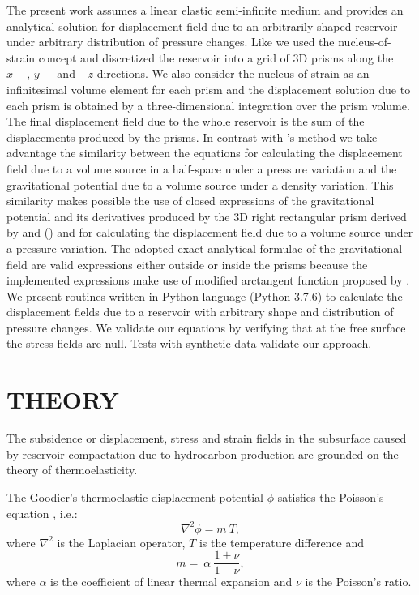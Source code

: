 \documentclass[journal abbreviation, manuscript]{copernicus}
\begin{document}
The present work assumes a linear elastic semi-infinite medium and provides an analytical solution for displacement field due to an arbitrarily-shaped reservoir under arbitrary distribution of pressure changes. 
Like \cite{Munoz&Roehl17} we used the nucleus-of-strain concept and discretized the
reservoir into a grid of 3D prisms along the $x-$, $y-$ and $-z$ directions.
We also consider the nucleus of strain as an infinitesimal volume element  for each prism and the displacement solution due to each prism is obtained by a three-dimensional integration over the prism volume. 
The final displacement field due to the whole reservoir is the sum of the displacements produced by the prisms. 
In contrast with \cite{Munoz&Roehl17}'s method we take advantage the similarity between 
the  equations for calculating the displacement field due to a volume source in a half-space under a pressure variation and the gravitational potential due to a volume source under a density variation.
This similarity makes possible the use of closed expressions of the gravitational potential and its derivatives produced by the 3D right rectangular prism derived by \cite{Nagyetal2000} and (\citeyear{Nagyetal2002}) and \cite{Fukushima2020}  for calculating the displacement field due to a volume source under a pressure variation.
The adopted exact analytical formulae of the gravitational field  are valid expressions either outside or inside the prisms because the implemented expressions make use of  modified arctangent function proposed by \cite{Fukushima2020}. 
We present routines written in Python language (Python 3.7.6)  to calculate the displacement fields due to a reservoir with arbitrary shape and distribution of pressure changes. 
We validate our equations by verifying that at the free surface the stress fields are null.
Tests with synthetic data validate our approach. 

\section{THEORY}

The subsidence or displacement, stress and strain fields in the subsurface caused by reservoir compactation due to hydrocarbon production are grounded on the theory of thermoelasticity. 

The Goodier’s thermoelastic displacement potential $\phi$ satisfies the Poisson's equation \citep{Goodier37}, i.e.:
\begin{equation}
\nabla^{2} \phi =  m \: T,
\label{eq:poisson}
\end{equation}
where $\nabla^{2}$ is the Laplacian operator, $T $ is the temperature difference and 
\begin{equation}
m =  \:  \alpha \: \frac{1 + \nu}{ 1 -\nu},
\label{eq:m}
\end{equation}
where $\alpha$  is the coefficient of linear thermal expansion and $\nu$ is the Poisson's ratio.
\end{document}

